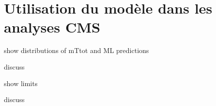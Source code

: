 \section{Utilisation du modèle dans les analyses CMS}\label{chapter-ML-section-use_HTT}

show distributions of mTtot and ML predictions

discuss

show limits

discuss
